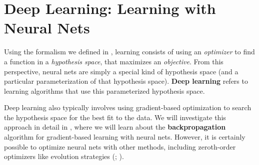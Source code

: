 
\section{Deep Learning: Learning with Neural Nets}
Using the formalism we defined in \chap{\ref{chapter:intro_to_learning}}, learning consists of using an \emph{optimizer} to find a function in a \emph{hypothesis space}, that maximizes an \emph{objective}. From this perspective, neural nets are simply a special kind of hypothesis space (and a particular parameterization of that hypothesis space). \textbf{Deep learning} refers to learning algorithms that use this parameterized hypothesis space.

Deep learning also typically involves using gradient-based optimization to search the hypothesis space for the best fit to the data. We will investigate this approach in detail in \chap{\ref{chapter:backpropagation}}, where we will learn about the \textbf{backpropagation} algorithm for gradient-based learning with neural nets. However, it is certainly possible to optimize neural nets with other methods, including zeroth-order optimizers like evolution strategies (\sect{\ref{sec:gradient_descent:zeroth_order}}; \cite{salimans2017evolution}). 

